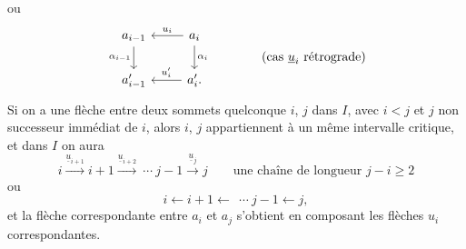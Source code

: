 ou
\[
\begin{tikzcd}
a_{i-1} \arrow[d, "\alpha_{i-1}"'] & a_i \arrow[l, "u_i"'] \arrow[d, "\alpha_i"] \\
a'_{i-1} & a'_i. \arrow[l, "u'_i"']
\end{tikzcd}
\qquad\qquad \text{(cas $\underline{u}_i$ rétrograde)}
\]
Si on a une flèche entre deux sommets quelconque $i$, $j$ dans $I$, avec $i < j$ et $j$ non successeur immédiat de $i$, alors $i$, $j$ appartiennent à un même intervalle critique, et dans $I$ on aura %
\[
i \xrightarrow{\underline{u}_{i+1}} i+1 \xrightarrow{\underline{u}_{i+2}}\ \cdots\ j-1 \xrightarrow{\underline{u}_j} j \qquad \text{une chaîne de longueur } j-i \geq 2 %
\]
ou
\[
i \longleftarrow i+1 \longleftarrow\ \ \cdots\ j-1 \longleftarrow j,
\]
et la flèche correspondante entre $a_i$ et $a_j$ s'obtient en composant les flèches $u_i$ correspondantes.


